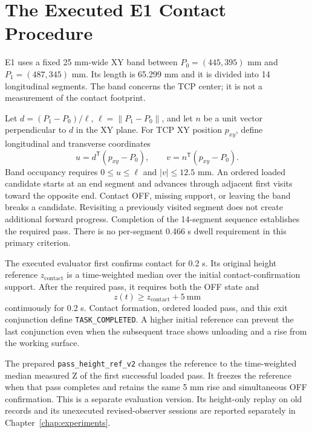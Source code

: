 \section{The Executed E1 Contact Procedure}
E1 uses a fixed 25 mm-wide XY band between \(P_0=(445,395)\) mm and \(P_1=(487,345)\) mm. Its length is 65.299 mm and it is divided into 14 longitudinal segments. The band concerns the TCP center; it is not a measurement of the contact footprint.

Let \(d=(P_1-P_0)/\ell\), \(\ell=\|P_1-P_0\|\), and let \(n\) be a unit vector perpendicular to \(d\) in the XY plane. For TCP XY position \(p_{xy}\), define longitudinal and transverse coordinates
\begin{equation}
 u=d^\mathsf{T}(p_{xy}-P_0),\qquad
 v=n^\mathsf{T}(p_{xy}-P_0).
 \label{eq:task_band}
\end{equation}
Band occupancy requires \(0\leq u\leq\ell\) and \(|v|\leq12.5\) mm. An ordered loaded candidate starts at an end segment and advances through adjacent first visits toward the opposite end. Contact OFF, missing support, or leaving the band breaks a candidate. Revisiting a previously visited segment does not create additional forward progress. Completion of the 14-segment sequence establishes the required pass. There is no per-segment 0.466 s dwell requirement in this primary criterion.

The executed evaluator first confirms contact for 0.2 s. Its original height reference \(z_{\mathrm{contact}}\) is a time-weighted median over the initial contact-confirmation support. After the required pass, it requires both the OFF state and
\begin{equation}
 z(t)\geq z_{\mathrm{contact}}+5\ \mathrm{mm}
 \label{eq:original_release}
\end{equation}
continuously for 0.2 s. Contact formation, ordered loaded pass, and this exit conjunction define \texttt{TASK\_COMPLETED}. A higher initial reference can prevent the last conjunction even when the subsequent trace shows unloading and a rise from the working surface.

The prepared \texttt{pass\_height\_ref\_v2} changes the reference to the time-weighted median measured Z of the first successful loaded pass. It freezes the reference when that pass completes and retains the same 5 mm rise and simultaneous OFF confirmation. This is a separate evaluation version. Its height-only replay on old records and its unexecuted revised-observer sessions are reported separately in Chapter~\ref{chap:experiments}.

